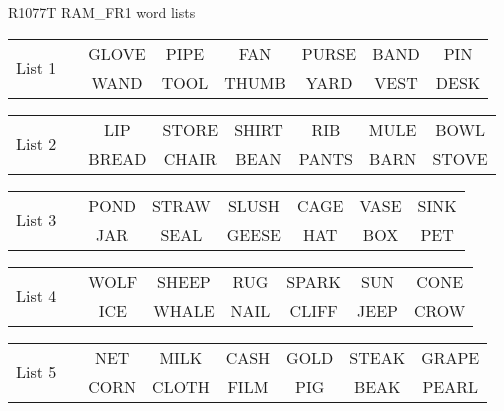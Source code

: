 \documentclass{article}
\begin{document}
\begin{center}
{\large R1077T RAM\_FR1 word lists}
\end{center}

\vspace{.1in}
\hspace{.5in}\begin{tabular}{r||c c c c c c }
\multirow{2}{*}{List 1~~} & GLOVE & PIPE & FAN & PURSE & BAND & PIN\\
\cline{2-7}			& WAND & TOOL & THUMB & YARD & VEST & DESK\\
\end{tabular}

\vspace{.1in}
\hspace{.5in}\begin{tabular}{r||c c c c c c }
\multirow{2}{*}{List 2~~} & LIP & STORE & SHIRT & RIB & MULE & BOWL\\
\cline{2-7}			& BREAD & CHAIR & BEAN & PANTS & BARN & STOVE\\
\end{tabular}

\vspace{.1in}
\hspace{.5in}\begin{tabular}{r||c c c c c c }
\multirow{2}{*}{List 3~~} & POND & STRAW & SLUSH & CAGE & VASE & SINK\\
\cline{2-7}			& JAR & SEAL & GEESE & HAT & BOX & PET\\
\end{tabular}

\vspace{.1in}
\hspace{.5in}\begin{tabular}{r||c c c c c c }
\multirow{2}{*}{List 4~~} & WOLF & SHEEP & RUG & SPARK & SUN & CONE\\
\cline{2-7}			& ICE & WHALE & NAIL & CLIFF & JEEP & CROW\\
\end{tabular}

\vspace{.1in}
\hspace{.5in}\begin{tabular}{r||c c c c c c }
\multirow{2}{*}{List 5~~} & NET & MILK & CASH & GOLD & STEAK & GRAPE\\
\cline{2-7}			& CORN & CLOTH & FILM & PIG & BEAK & PEARL\\
\end{tabular}
\end{document}
